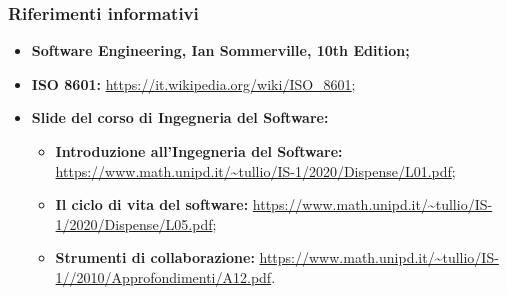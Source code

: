 \subsubsection{Riferimenti informativi}
\begin{itemize}
	\item \textbf{Software Engineering, Ian Sommerville, 10th Edition;}
	\item \textbf{ISO 8601:} \url{https://it.wikipedia.org/wiki/ISO_8601};
	\item \textbf{Slide del corso di Ingegneria del Software:}
		\begin{itemize}
			\item \textbf{Introduzione all’Ingegneria del Software:} \url{https://www.math.unipd.it/~tullio/IS-1/2020/Dispense/L01.pdf};
			\item \textbf{Il ciclo di vita del software:} \url {https://www.math.unipd.it/~tullio/IS-1/2020/Dispense/L05.pdf};
			\item \textbf{Strumenti di collaborazione:} \url{https://www.math.unipd.it/~tullio/IS-1//2010/Approfondimenti/A12.pdf}.
		\end{itemize}
\end{itemize}
